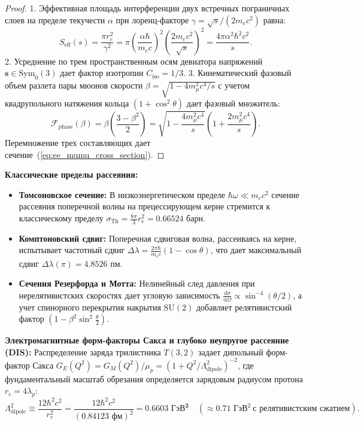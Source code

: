 \documentclass[11pt,a4paper]{article}
\theoremstyle{definition}
\theoremstyle{remark}
\begin{document}
\begin{proof}
1. Эффективная площадь интерференции двух встречных пограничных слоев на пределе текучести $\alpha$ при лоренц-факторе $\gamma = \sqrt{s} / (2m_e c^2)$ равна:
\begin{equation}
    S_{\mathrm{eff}}(s) = \frac{\pi r_e^2}{\gamma^2} = \pi \left( \frac{\alpha \hbar}{m_e c} \right)^2 \left( \frac{2 m_e c^2}{\sqrt{s}} \right)^2 = \frac{4\pi \alpha^2 \hbar^2 c^2}{s}.
\end{equation}
2. Усреднение по трем пространственным осям девиатора напряжений $\mathbf{s} \in \mathrm{Sym}_0(3)$ дает фактор изотропии $C_{\mathrm{iso}} = 1/3$.
3. Кинематический фазовый объем разлета пары мюонов скорости $\beta = \sqrt{1 - 4m_\mu^2 c^4/s}$ с учетом квадрупольного натяжения кольца $(1+\cos^2\theta)$ дает фазовый множитель:
\begin{equation}
    \mathcal{F}_{\mathrm{phase}}(\beta) = \beta \left( \frac{3 - \beta^2}{2} \right) = \sqrt{1 - \frac{4m_\mu^2 c^4}{s}} \left( 1 + \frac{2m_\mu^2 c^4}{s} \right).
\end{equation}
Перемножение трех составляющих дает сечение~(\ref{eq:ee_mumu_cross_section}).
\end{proof}

\textbf{Классические пределы рассеяния:}
\begin{itemize}
    \item \textbf{Томсоновское сечение:} В низкоэнергетическом пределе $\hbar\omega \ll m_e c^2$ сечение рассеяния поперечной волны на прецессирующем керне стремится к классическому пределу $\sigma_{\mathrm{Th}} = \frac{8\pi}{3} r_e^2 = \mathbf{0.66524\text{ барн}}$.
    \item \textbf{Комптоновский сдвиг:} Поперечная сдвиговая волна, рассеиваясь на керне, испытывает частотный сдвиг $\Delta\lambda = \frac{2\pi\hbar}{m_e c}(1 - \cos\theta)$, что дает максимальный сдвиг $\Delta\lambda(\pi) = 4.8526\text{ пм}$.
    \item \textbf{Сечения Резерфорда и Мотта:} Нелинейный след давления при нерелятивистских скоростях дает угловую зависимость $\frac{\mathrm{d}\sigma}{\mathrm{d}\Omega} \propto \sin^{-4}(\theta/2)$, а учет спинорного перекрытия накрытия $\mathrm{SU}(2)$ добавляет релятивистский фактор $(1 - \beta^2\sin^2\frac{\theta}{2})$.
\end{itemize}

\textbf{Электромагнитные форм-факторы Сакса и глубоко неупругое рассеяние (DIS):}
Распределение заряда трилистника $T(3,2)$ задает дипольный форм-фактор Сакса $G_E(Q^2) = G_M(Q^2)/\mu_p = (1 + Q^2/\Lambda_{\mathrm{dipole}}^2)^{-2}$, где фундаментальный масштаб обрезания определяется зарядовым радиусом протона $r_c = 4\lambda_p$:
\begin{equation}
    \Lambda_{\mathrm{dipole}}^2 \equiv \frac{12 \hbar^2 c^2}{r_c^2} = \frac{12 \hbar^2 c^2}{(0.84123\text{ фм})^2} = \mathbf{0.6603\text{ ГэВ}^2} \quad (\approx 0.71\text{ ГэВ}^2 \ \text{с релятивистским сжатием}).
\end{equation}
\end{document}
